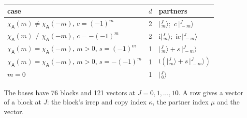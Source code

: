 \documentclass[10pt,a4paper]{article}
\numberwithin{equation}{section}
\newcommand{\grp}[1]{\mathsf{#1}}
\newcommand{\iunit}{\mathrm{i}}
\newcommand{\chiA}{\chi_{\grp{A}}}
\newcommand{\mult}{\kappa}
\newcommand{\intx}{\mu}
\newcommand{\jm}[2]{\bigl\lvert{}^{#1}_{\,#2}\bigr\rangle}
\begin{document}
\begin{center}\begin{tabular}{@{}lrl@{}}\toprule
case & $d$ & partners\\\midrule
$\chiA(m) \ne \chiA(-m)$, $c = (-1)^m$ & 2 & $\jm{J}{m}$;\ $c\,\jm{J}{-m}$\\
$\chiA(m) \ne \chiA(-m)$, $c = -(-1)^m$ & 2 & $\iunit\jm{J}{m}$;\ $\iunit c\,\jm{J}{-m}$\\
$\chiA(m) = \chiA(-m)$, $m > 0$, $s = (-1)^m$ & 1 & $\jm{J}{m} + s\,\jm{J}{-m}$\\
$\chiA(m) = \chiA(-m)$, $m > 0$, $s = -(-1)^m$ & 1 & $\iunit(\jm{J}{m} + s\,\jm{J}{-m})$\\
$m = 0$ & 1 & $\jm{J}{0}$\\
\bottomrule\end{tabular}\end{center}
The bases have 76 blocks and 121 vectors at $J = 0, 1, \dots, 10$. \label{n:head.vector}A row gives a vector of a block at $J$: the block's irrep and copy index $\mult$, the partner index $\intx$ and the vector.
\end{document}

